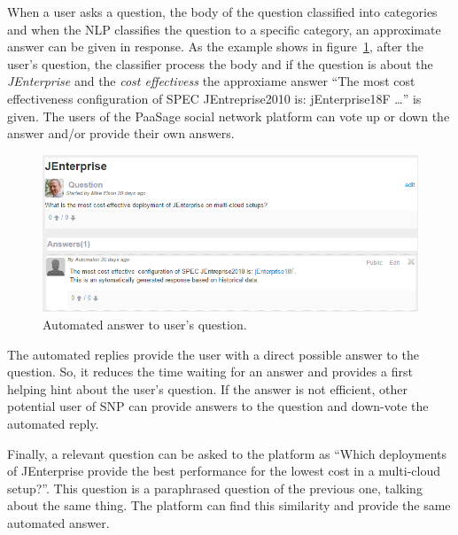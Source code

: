 When a user asks a question, the body of the question classified into categories and when the NLP classifies the question to a specific category, an approximate answer can be given in response. As the example shows in figure~\ref{fig:nlp_example}, after the user's question, the classifier process the body and if the question is about the {\it JEnterprise} and the {\it cost effectivess} the approxiame answer ``The most cost effectiveness configuration of SPEC JEntreprise2010 is: jEnterprise18F \ldots'' is given. The users of the PaaSage social network platform can vote up or down the answer and/or provide their own answers.

\begin{figure}
  \centering
  \includegraphics[scale=0.6]{./fig/nlp_example.png}
  \caption{Automated answer to user's question.}
  \label{fig:nlp_example}
\end{figure}

The automated replies provide the user with a direct possible answer to the question. So, it reduces the time waiting for an answer and provides a first helping hint about the user's question. If the answer is not efficient, other potential user of SNP can provide answers to the question and down-vote the automated reply.

Finally, a relevant question can be asked to the platform as ``Which deployments of JEnterprise provide the best performance for the lowest cost in a multi-cloud setup?''. This question is a paraphrased question of the previous one, talking about the same thing. The platform can find this similarity and provide the same automated answer.

